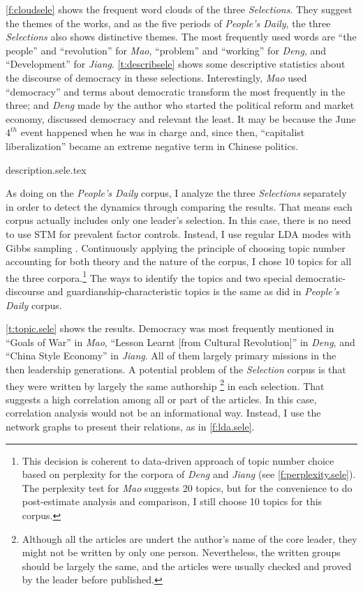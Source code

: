 \documentclass[abstracton,UTF8]{ctexart}
\begin{document}
\cref{f:cloudsele} shows the frequent word clouds of the three \textit{Selections}. They suggest the themes of the works, and as the five periods of \textit{People's Daily}, the three \textit{Selections} also shows distinctive themes. The most frequently used words are ``the people'' and ``revolution'' for \textit{Mao}, ``problem'' and ``working'' for \textit{Deng}, and ``Development'' for \textit{Jiang}. \cref{t:describsele} shows some descriptive statistics about the discourse of democracy in these selections. Interestingly, \textit{Mao} used ``democracy'' and terms about democratic transform the most frequently in the three; and \textit{Deng} made by the author who started the political reform and market economy, discussed democracy and relevant the least. It may be because the June $4^{th}$ event happened when he was in charge and, since then, ``capitalist liberalization'' became an extreme negative term in Chinese politics. 


{description.sele.tex}

As doing on the \textit{People's Daily} corpus, I analyze the three \textit{Selections} separately in order to detect the dynamics through comparing the results. That means each corpus actually includes only one leader's selection. In this case, there is no need to use STM for prevalent factor controls. Instead, I use regular LDA modes with Gibbs sampling \citep{Griffiths2004,Phan2008}. Continuously applying the principle of choosing topic number accounting for both theory and the nature of the corpus, I chose 10 topics for all the three corpora.\footnote{This decision is coherent to data-driven approach of topic number choice based on  perplexity for the corpora of \textit{Deng} and \textit{Jiang} (see \cref{f:perplexity.sele}). The perplexity test for \textit{Mao} suggests 20 topics, but for the convenience to do post-estimate analysis and comparison, I still choose 10 topics for this corpus.} The ways to identify the topics and two special democratic-discourse and guardianship-characteristic topics is the same as did in \textit{People's Daily} corpus. 

\cref{t:topic.sele} shows the results. Democracy was most frequently mentioned in ``Goals of War'' in \textit{Mao}, ``Lesson Learnt [from Cultural Revolution]'' in \textit{Deng}, and ``China Style Economy'' in \textit{Jiang}. All of them largely primary missions in the then leadership generations. A potential problem of the \textit{Selection} corpus is that they were written by largely the same authorship \footnote{Although all the articles are undert the author's name of the core leader, they might not be written by only one person. Nevertheless, the written groups should be largely the same, and the articles were usually checked and proved by the leader before published.} in each selection. That suggests a high correlation among all or part of the articles. In this case, correlation analysis would not be an informational way. Instead, I use the network graphs to present their relations, as in \cref{f:lda.sele}.
\end{document}

